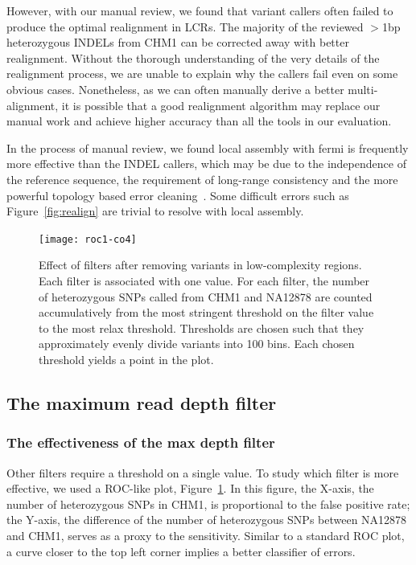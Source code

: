 \documentclass{bioinfo}
\begin{document}
However, with our manual review, we found that variant callers often failed to
produce the optimal realignment in LCRs. The majority of the reviewed
$>$1bp heterozygous INDELs from CHM1 can be corrected away with better
realignment. Without the thorough understanding of the very details of the
realignment process, we are unable to explain why the callers fail even on some
obvious cases. Nonetheless, as we can often manually derive a better
multi-alignment, it is possible that a good realignment algorithm may replace
our manual work and achieve higher accuracy than all the tools in our
evaluation.

In the process of manual review, we found local assembly with fermi is
frequently more effective than the INDEL callers, which may be due to the
independence of the reference sequence, the requirement of long-range
consistency and the more powerful topology based error
cleaning~\citep{Zerbino:2008uq}. Some difficult errors such as
Figure~\ref{fig:realign} are trivial to resolve with local assembly.

\begin{figure}
\texttt{[image: roc1-co4]}
\caption{Effect of filters after removing variants in low-complexity regions.
Each filter is associated with one value.  For each filter, the number of
heterozygous SNPs called from CHM1 and NA12878 are counted accumulatively from
the most stringent threshold on the filter value to the most relax threshold.
Thresholds are chosen such that they approximately evenly divide variants into
100 bins. Each chosen threshold yields a point in the plot.}\label{fig:roc}
\end{figure}

\subsection{The maximum read depth filter}

\subsubsection{The effectiveness of the max depth filter}
Other filters require a threshold on a single value. To study
which filter is more effective, we used a ROC-like plot,
Figure~\ref{fig:roc}. In this figure, the X-axis, the number of heterozygous
SNPs in CHM1, is proportional to the false positive rate; the Y-axis, the
difference of the number of heterozygous SNPs between NA12878 and CHM1, serves
as a proxy to the sensitivity. Similar to a standard ROC plot, a curve closer
to the top left corner implies a better classifier of errors.
\end{document}
